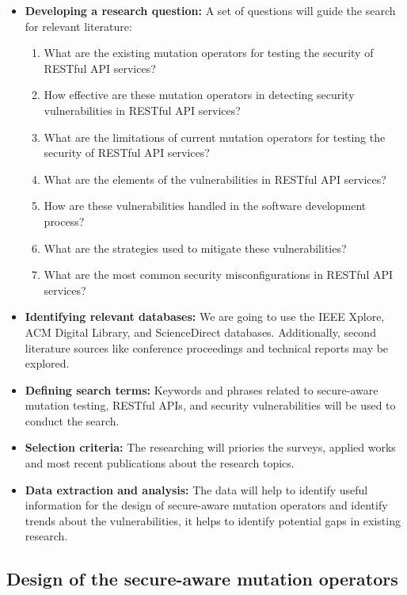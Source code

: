 \begin{itemize}
  \item \textbf{Developing a research question:} A set of questions will guide the search for relevant literature:
    \begin{enumerate}
      \item What are the existing mutation operators for testing the security of RESTful API services?
      \item How effective are these mutation operators in detecting security vulnerabilities in RESTful API services?
      \item What are the limitations of current mutation operators for testing the security of RESTful API services?
      \item What are the elements of the vulnerabilities in RESTful API services?
      \item How are these vulnerabilities handled in the software development process?
      \item What are the strategies used to mitigate these vulnerabilities?
      \item What are the most common security misconfigurations in RESTful API services?
    \end{enumerate}
  \item \textbf{Identifying relevant databases:} We are going to use the IEEE Xplore, ACM Digital Library, and ScienceDirect databases. Additionally, second literature sources like conference proceedings and technical reports may be explored.
  \item \textbf{Defining search terms:} Keywords and phrases related to secure-aware mutation testing, RESTful APIs, and security vulnerabilities will be used to conduct the search.
  \item \textbf{Selection criteria:} The researching will priories the surveys, applied works and most recent publications about the research topics.
  \item \textbf{Data extraction and analysis:} The data will help to identify useful information for the design of secure-aware mutation operators and identify trends about the vulnerabilities, it helps to identify potential gaps in existing research.
\end{itemize}

\subsection{Design of the secure-aware mutation operators}

